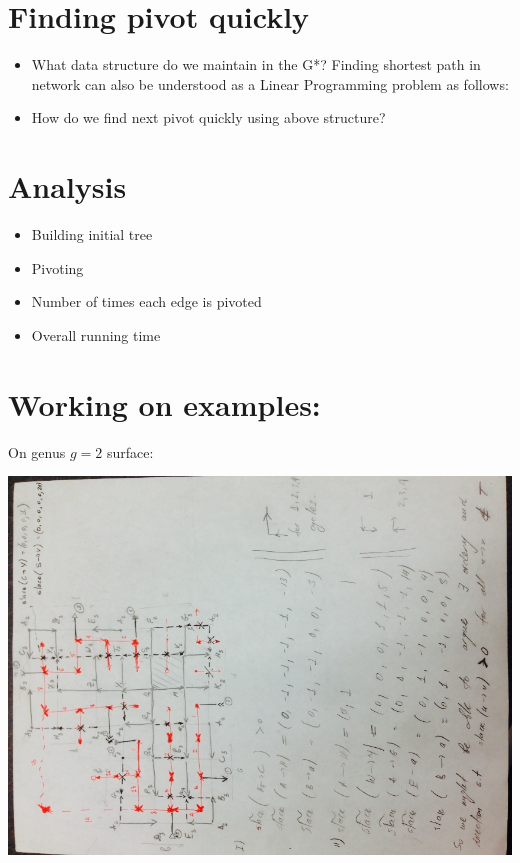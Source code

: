 \documentclass{article}
\begin{document}
\section{Finding pivot quickly}
\begin{itemize}
\item What data structure do we maintain in the G*?
Finding shortest path in network can also be understood as a Linear Programming 
problem as follows:
\item How do we find next pivot quickly using above structure?
\end{itemize}

\section{Analysis}
\begin{itemize}
\item Building initial tree
\item Pivoting
\item Number of times each edge is pivoted
\item Overall running time
\end{itemize}

\iffalse
\newpage
\section{Working on examples:}

On genus $g = 2$ surface:
\begin{center}
\includegraphics[angle = -90, scale = 0.7]{figures/genus2.jpg}
\end{center}
\end{document}
